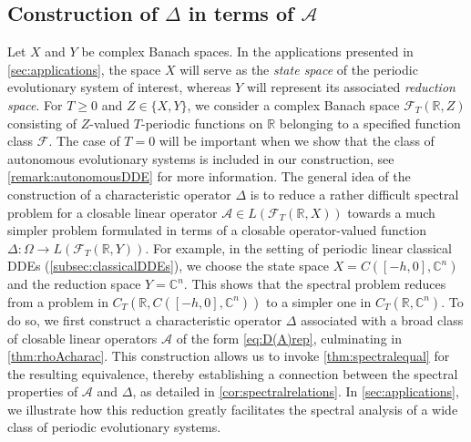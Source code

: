 \documentclass[english]{myarticle}
\begin{document}
\begin{sloppypar}
\subsection{Construction of $\Delta$ in terms of $\mathcal{A}$} \label{subsec:construction}

Let $X$ and $Y$ be complex Banach spaces. In the applications presented in \cref{sec:applications}, the space $X$ will serve as the \emph{state space} of the periodic evolutionary system of interest, whereas $Y$ will represent its associated \emph{reduction space}. For $T \geq 0$ and $Z \in \{X,Y\}$, we consider a complex Banach space 
$\mathcal{F}_T(\mathbb{R},Z)$ consisting of $Z$-valued $T$-periodic functions on $\mathbb{R}$ belonging to a specified function class $\mathcal{F}$. The case of $T=0$ will be important when we show that the class of autonomous evolutionary systems is included in our construction, see \cref{remark:autonomousDDE} for more information. The general idea of the construction of a characteristic operator $\Delta$ is to reduce a rather difficult spectral problem for a closable linear operator $\mathcal{A} \in L(\mathcal{F}_T(\mathbb{R},X))$ towards a much simpler problem formulated in terms of a closable operator-valued function $\Delta : \Omega \to L(\mathcal{F}_T(\mathbb{R},Y))$. For example, in the setting of periodic linear classical DDEs (\cref{subsec:classicalDDEs}), we choose the state space $X = C([-h,0], \mathbb{C}^n)$ and the reduction space $Y = \mathbb{C}^n$. This shows that the spectral problem reduces from a problem in 
$C_T(\mathbb{R}, C([-h,0], \mathbb{C}^n))$ to a simpler one in $C_T(\mathbb{R}, \mathbb{C}^n)$. To do so, we first construct a characteristic operator $\Delta$ associated with a broad class of closable linear operators $\mathcal{A}$ of the form \eqref{eq:D(A)rep}, culminating in \cref{thm:rhoAcharac}. This construction allows us to invoke \cref{thm:spectralequal} for the resulting equivalence, thereby establishing a connection between the spectral properties of $\mathcal{A}$ and $\Delta$, as detailed in \cref{cor:spectralrelations}. In \cref{sec:applications}, we illustrate how this reduction greatly facilitates the spectral analysis of a wide class of periodic evolutionary systems.


\end{sloppypar}
\end{document}
